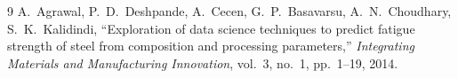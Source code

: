\documentclass[12pt,a4paper]{article}
\begin{document}
\begin{thebibliography}{9}
  A.~Agrawal, P.~D.~Deshpande, A.~Cecen, G.~P.~Basavarsu, A.~N.~Choudhary, S.~K.~Kalidindi,
  ``Exploration of data science techniques to predict fatigue strength of steel from composition
  and processing parameters,''
  \textit{Integrating Materials and Manufacturing Innovation}, vol.~3, no.~1, pp.~1--19, 2014.
\end{thebibliography}
\end{document}
